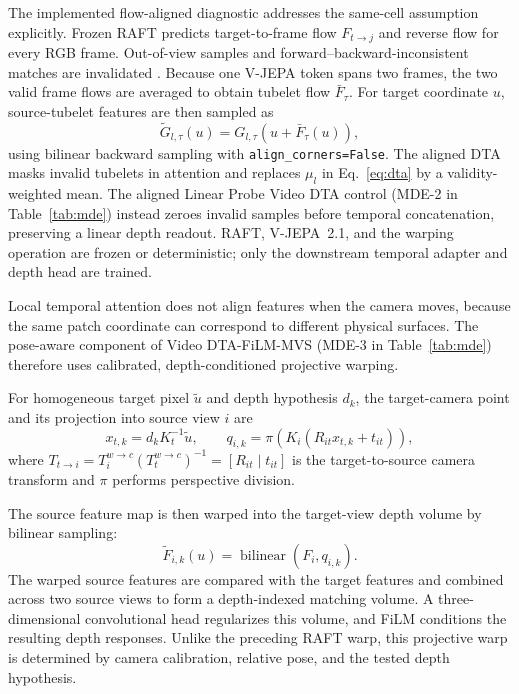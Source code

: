 The implemented flow-aligned diagnostic addresses the same-cell assumption explicitly. Frozen RAFT \cite{teed2020raft} predicts target-to-frame flow $F_{t\rightarrow j}$ and reverse flow for every RGB frame. Out-of-view samples and forward--backward-inconsistent matches are invalidated \cite{meister2018unflow}. Because one V-JEPA token spans two frames, the two valid frame flows are averaged to obtain tubelet flow $\bar F_\tau$. For target coordinate $u$, source-tubelet features are then sampled as
\begin{equation}
\widetilde G_{l,\tau}(u)=G_{l,\tau}\!\left(u+\bar F_\tau(u)\right),
\label{eq:raft_warp}
\end{equation}
using bilinear backward sampling with \texttt{align\_corners=False}. The aligned DTA masks invalid tubelets in attention and replaces $\mu_l$ in Eq.~\eqref{eq:dta} by a validity-weighted mean. The aligned Linear Probe Video DTA control (MDE-2 in Table~\ref{tab:mde}) instead zeroes invalid samples before temporal concatenation, preserving a linear depth readout. RAFT, V-JEPA~2.1, and the warping operation are frozen or deterministic; only the downstream temporal adapter and depth head are trained.

Local temporal attention does not align features when the camera moves, because the same patch coordinate can correspond to different physical surfaces. The pose-aware component of Video DTA-FiLM-MVS (MDE-3 in Table~\ref{tab:mde}) therefore uses calibrated, depth-conditioned projective warping.

For homogeneous target pixel $\tilde u$ and depth hypothesis $d_k$, the target-camera point and its projection into source view $i$ are
\begin{equation}
x_{t,k}=d_kK_t^{-1}\tilde u,\qquad
q_{i,k}=\pi\!\left(K_i(R_{it}x_{t,k}+t_{it})\right),
\label{eq:projection}
\end{equation}
where
$T_{t\rightarrow i}
=T_i^{w\rightarrow c}(T_t^{w\rightarrow c})^{-1}
=[R_{it}\mid t_{it}]$
is the target-to-source camera transform and $\pi$ performs perspective division.

The source feature map is then warped into the target-view depth volume by bilinear sampling:
\begin{equation}
\widetilde F_{i,k}(u)
=
\operatorname{bilinear}\!\left(F_i,q_{i,k}\right).
\label{eq:mvs_warp}
\end{equation}
The warped source features are compared with the target features and combined across two source views to form a depth-indexed matching volume. A three-dimensional convolutional head regularizes this volume, and FiLM conditions the resulting depth responses. Unlike the preceding RAFT warp, this projective warp is determined by camera calibration, relative pose, and the tested depth hypothesis.

